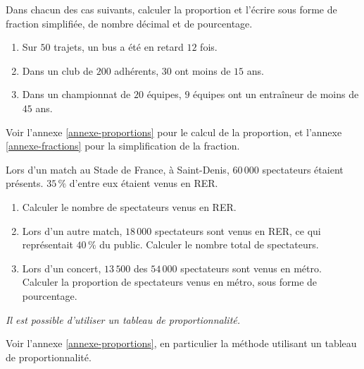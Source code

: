 \documentclass[10pt,a4paper]{article}
\begin{document}
\begin{bloc}
\begin{exo}
Dans chacun des cas suivants, calculer la proportion et l'écrire sous forme de fraction simplifiée, de nombre décimal et de pourcentage.
\begin{enumerate}[leftmargin=*]
    \item Sur \(50\) trajets, un bus a été en retard \(12\) fois.
    \item Dans un club de \(200\) adhérents, \(30\) ont moins de \(15\) ans.
    \item Dans un championnat de \(20\) équipes, \(9\) équipes ont un entraîneur de moins de \(45\) ans.
\end{enumerate}
\end{exo}

\begin{indication}
    Voir l'annexe \ref{annexe-proportions} pour le calcul de la proportion, et l'annexe \ref{annexe-fractions} pour la simplification de la fraction.
\end{indication}
\end{bloc}

\begin{bloc}
\begin{exo}
Lors d'un match au Stade de France, à Saint-Denis, \(60\,000\) spectateurs étaient présents. \(35\,\%\) d'entre eux étaient venus en RER.
\begin{enumerate}[leftmargin=*]
    \item Calculer le nombre de spectateurs venus en RER.
    \item Lors d'un autre match, \(18\,000\) spectateurs sont venus en RER, ce qui représentait \(40\,\%\) du public. Calculer le nombre total de spectateurs.
    \item Lors d'un concert, \(13\,500\) des \(54\,000\) spectateurs sont venus en métro. Calculer la proportion de spectateurs venus en métro, sous forme de pourcentage.
\end{enumerate}
\textit{Il est possible d'utiliser un tableau de proportionnalité.}
\end{exo}

\begin{indication}
    Voir l'annexe \ref{annexe-proportions}, en particulier la méthode utilisant un tableau de proportionnalité.
\end{indication}
\end{bloc}
\end{document}
